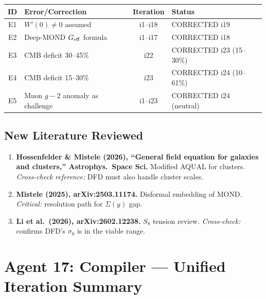 \documentclass[11pt]{article}
\newcommand{\Geff}{G_{\rm eff}}
\begin{document}
\begin{center}
\begin{tabular}{clcl}
\toprule
\textbf{ID} & \textbf{Error/Correction} & \textbf{Iteration} & \textbf{Status} \\
\midrule
E1 & $W'(0) \neq 0$ assumed & i1--i18 & CORRECTED i19 \\
E2 & Deep-MOND $\Geff$ formula & i1--i17 & CORRECTED i18 \\
E3 & CMB deficit 30--45\% & i22 & CORRECTED i23 (15--30\%) \\
E4 & CMB deficit 15--30\% & i23 & CORRECTED i24 (10--61\%) \\
E5 & Muon $g-2$ anomaly as challenge & i1--i23 & CORRECTED i24 (neutral) \\
\bottomrule
\end{tabular}
\end{center}

\subsection{New Literature Reviewed}

\begin{tcolorbox}[colback=green!5!white, colframe=green!50!black,
  title=\textbf{Agent 16: NEW LITERATURE REVIEWED}]

\begin{enumerate}

\item \textbf{Hossenfelder \& Mistele (2026), ``General field equation
  for galaxies and clusters,'' Astrophys.\ Space Sci.}
  Modified AQUAL for clusters. \emph{Cross-check reference:} DFD
  must also handle cluster scales.

\item \textbf{Mistele (2025), arXiv:2503.11174.}
  Disformal embedding of MOND. \emph{Critical:} resolution path
  for $\Sigma(y)$ gap.

\item \textbf{Li et al.\ (2026), arXiv:2602.12238.}
  $S_8$ tension review. \emph{Cross-check:} confirms DFD's $\sigma_8$
  is in the viable range.

\end{enumerate}
\end{tcolorbox}

\section{Agent 17: Compiler --- Unified Iteration Summary}
\end{document}
